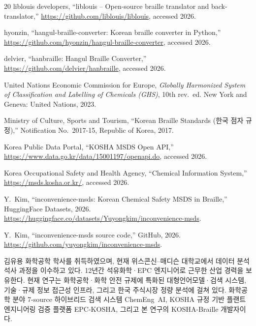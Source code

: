 \documentclass[journal]{IEEEtran}
\begin{document}
\begin{thebibliography}{20}
liblouis developers, ``liblouis -- Open-source braille translator and back-translator,'' \url{https://github.com/liblouis/liblouis}, accessed 2026.

hyonzin, ``hangul-braille-converter: Korean braille converter in Python,'' \url{https://github.com/hyonzin/hangul-braille-converter}, accessed 2026.

delvier, ``hanbraille: Hangul Braille Converter,'' \url{https://github.com/delvier/hanbraille}, accessed 2026.

United Nations Economic Commission for Europe, \emph{Globally Harmonized System of Classification and Labelling of Chemicals (GHS)}, 10th rev.~ed. New York and Geneva: United Nations, 2023.

Ministry of Culture, Sports and Tourism, ``Korean Braille Standards (한국 점자 규정),'' Notification No.~2017-15, Republic of Korea, 2017.

Korea Public Data Portal, ``KOSHA MSDS Open API,'' \url{https://www.data.go.kr/data/15001197/openapi.do}, accessed 2026.

Korea Occupational Safety and Health Agency, ``Chemical Information System,'' \url{https://msds.kosha.or.kr/}, accessed 2026.

Y.~Kim, ``inconvenience-msds: Korean Chemical Safety MSDS in Braille,'' HuggingFace Datasets, 2026. \url{https://huggingface.co/datasets/Yuyongkim/inconvenience-msds}.

Y.~Kim, ``inconvenience-msds source code,'' GitHub, 2026. \url{https://github.com/yuyongkim/inconvenience-msds}.

\end{thebibliography}

\begin{IEEEbiography}[]{김유용}
화학공학 학사를 취득하였으며, 현재 위스콘신--매디슨 대학교에서 데이터 분석 석사 과정을 이수하고 있다. 12년간 석유화학·EPC 엔지니어로 근무한 산업 경력을 보유한다. 현재 연구는 화학공학·화학 안전 규제에 특화된 대형언어모델·검색 시스템, 기술·규제 정보 접근성 인프라, 그리고 한국 주식시장 정량 분석에 걸쳐 있다. 화학공학 분야 7-source 하이브리드 검색 시스템 ChemEng~AI, KOSHA 규정 기반 플랜트 엔지니어링 검증 플랫폼 EPC-KOSHA, 그리고 본 연구의 KOSHA-Braille 개발자이다.
\end{IEEEbiography}
\end{document}

